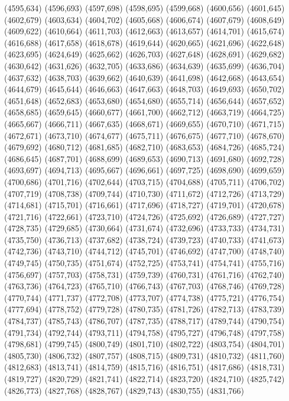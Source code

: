 (4595,634)
(4596,693)
(4597,698)
(4598,695)
(4599,668)
(4600,656)
(4601,645)
(4602,679)
(4603,634)
(4604,702)
(4605,668)
(4606,674)
(4607,679)
(4608,649)
(4609,622)
(4610,664)
(4611,703)
(4612,663)
(4613,657)
(4614,701)
(4615,674)
(4616,688)
(4617,658)
(4618,678)
(4619,644)
(4620,665)
(4621,696)
(4622,648)
(4623,695)
(4624,649)
(4625,662)
(4626,703)
(4627,648)
(4628,691)
(4629,682)
(4630,642)
(4631,626)
(4632,705)
(4633,686)
(4634,639)
(4635,699)
(4636,704)
(4637,632)
(4638,703)
(4639,662)
(4640,639)
(4641,698)
(4642,668)
(4643,654)
(4644,679)
(4645,644)
(4646,663)
(4647,663)
(4648,703)
(4649,693)
(4650,702)
(4651,648)
(4652,683)
(4653,680)
(4654,680)
(4655,714)
(4656,644)
(4657,652)
(4658,685)
(4659,645)
(4660,677)
(4661,700)
(4662,712)
(4663,719)
(4664,725)
(4665,667)
(4666,711)
(4667,635)
(4668,671)
(4669,655)
(4670,710)
(4671,715)
(4672,671)
(4673,710)
(4674,677)
(4675,711)
(4676,675)
(4677,710)
(4678,670)
(4679,692)
(4680,712)
(4681,685)
(4682,710)
(4683,653)
(4684,726)
(4685,724)
(4686,645)
(4687,701)
(4688,699)
(4689,653)
(4690,713)
(4691,680)
(4692,728)
(4693,697)
(4694,713)
(4695,667)
(4696,661)
(4697,725)
(4698,690)
(4699,659)
(4700,686)
(4701,716)
(4702,644)
(4703,715)
(4704,688)
(4705,711)
(4706,702)
(4707,719)
(4708,738)
(4709,744)
(4710,730)
(4711,672)
(4712,726)
(4713,729)
(4714,681)
(4715,701)
(4716,661)
(4717,696)
(4718,727)
(4719,701)
(4720,678)
(4721,716)
(4722,661)
(4723,710)
(4724,726)
(4725,692)
(4726,689)
(4727,727)
(4728,735)
(4729,685)
(4730,664)
(4731,674)
(4732,696)
(4733,733)
(4734,731)
(4735,750)
(4736,713)
(4737,682)
(4738,724)
(4739,723)
(4740,733)
(4741,673)
(4742,736)
(4743,710)
(4744,712)
(4745,701)
(4746,692)
(4747,700)
(4748,740)
(4749,745)
(4750,735)
(4751,674)
(4752,725)
(4753,741)
(4754,741)
(4755,716)
(4756,697)
(4757,703)
(4758,731)
(4759,739)
(4760,731)
(4761,716)
(4762,740)
(4763,736)
(4764,723)
(4765,710)
(4766,743)
(4767,703)
(4768,746)
(4769,728)
(4770,744)
(4771,737)
(4772,708)
(4773,707)
(4774,738)
(4775,721)
(4776,754)
(4777,694)
(4778,752)
(4779,728)
(4780,735)
(4781,726)
(4782,713)
(4783,739)
(4784,737)
(4785,743)
(4786,707)
(4787,735)
(4788,717)
(4789,744)
(4790,754)
(4791,734)
(4792,744)
(4793,711)
(4794,758)
(4795,727)
(4796,748)
(4797,758)
(4798,681)
(4799,745)
(4800,749)
(4801,710)
(4802,722)
(4803,754)
(4804,701)
(4805,730)
(4806,732)
(4807,757)
(4808,715)
(4809,731)
(4810,732)
(4811,760)
(4812,683)
(4813,741)
(4814,759)
(4815,716)
(4816,751)
(4817,686)
(4818,731)
(4819,727)
(4820,729)
(4821,741)
(4822,714)
(4823,720)
(4824,710)
(4825,742)
(4826,773)
(4827,768)
(4828,767)
(4829,743)
(4830,755)
(4831,766)
